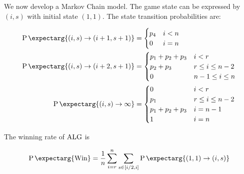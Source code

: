 \documentclass{article}
\newcommand{\prob}{\operatorname{P}\expectarg}
\begin{document}

We now develop a Markov Chain model. The game state can be expressed by $(i,s)$ with initial state $(1,1)$. The state transition probabilities are:

\begin{align}
\prob{(i,s)\to (i+1, s+1)} &= \begin{cases}
	p_4 & i < n\\
	0 & i = n
	\end{cases}\\
\prob{(i,s)\to (i+2, s+1)} &= 
	\begin{cases}
	p_1 + p_2 + p_3 & i < r\\
	p_2 + p_3 & r \leq i \leq n-2\\
	0 & n-1 \leq i \leq n
	\end{cases}\\
\prob{(i,s)\to \infty} &= 
	\begin{cases}
	0 & i < r\\
	p_1 & r \leq i \leq n-2 \\
	p_1 + p_2 + p_3 & i = n-1\\
	1 & i = n
	\end{cases}
\end{align}


The winning rate of $\text{ALG}$ is

\begin{equation}
  \prob{\text{Win}}=\frac{1}{n}\sum_{i=r}^n \sum_{s\in [i/2,i]} \prob{(1,1) \to (i,s)}
\end{equation}
\end{document}
